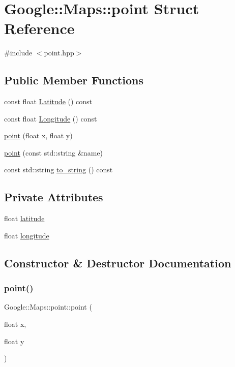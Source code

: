 \hypertarget{a00059}{}\section{Google\+:\+:Maps\+:\+:point Struct Reference}
\label{a00059}


{\ttfamily \#include $<$point.\+hpp$>$}

\subsection*{Public Member Functions}
\begin{DoxyCompactItemize}
\item 
const float \hyperlink{a00059_a4d2dcdbfa413c92d7a11fb7a280b5238}{Latitude} () const
\item 
const float \hyperlink{a00059_a0fd1c4ec3f383385b8981629e0acb188}{Longitude} () const
\item 
\hyperlink{a00059_abcf782dee7c73565e3db32b3d3d8c3f7}{point} (float x, float y)
\item 
\hyperlink{a00059_a5c633bface725d08067991fcfa0d0953}{point} (const std\+::string \&name)
\item 
const std\+::string \hyperlink{a00059_a9cc5bd886bee44b43dbaf9da0adb2ec3}{to\+\_\+string} () const
\end{DoxyCompactItemize}
\subsection*{Private Attributes}
\begin{DoxyCompactItemize}
\item 
float \hyperlink{a00059_af6b6537d2ea2525753d9e2f170fb2622}{latitude}
\item 
float \hyperlink{a00059_a488d9eb28fe2486d91173646ab620202}{longitude}
\end{DoxyCompactItemize}


\subsection{Constructor \& Destructor Documentation}
\mbox{\label{a00059_abcf782dee7c73565e3db32b3d3d8c3f7}} 
\subsubsection{\texorpdfstring{point()}{point()}\hspace{0.1cm}{\footnotesize\ttfamily [1/2]}}
{\footnotesize\ttfamily Google\+::\+Maps\+::point\+::point (\begin{DoxyParamCaption}\item[{float}]{x,  }\item[{float}]{y }\end{DoxyParamCaption})\hspace{0.3cm}{\ttfamily [inline]}}

